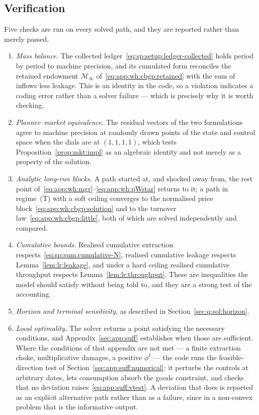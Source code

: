 \subsection{Verification}\label{sec:q:sol:verification}

Five checks are run on every solved path, and they are reported rather than merely passed.
\begin{enumerate}
\item \emph{Mass balance.} The collected ledger~\eqref{eq:sp:setup:ledger-collected} holds period by period to machine precision, and its cumulated form reconciles the retained endowment $\mathcal M_\infty$ of~\eqref{eq:app:wh:cbgp:retained} with the sum of inflows less leakage. This is an identity in the code, so a violation indicates a coding error rather than a solver failure --- which is precisely why it is worth checking.
\item \emph{Planner--market equivalence.} The residual vectors of the two formulations agree to machine precision at randomly drawn points of the state and control space when the dials are at $\left(1,1,1,1\right)$, which tests Proposition~\ref{prop:mkt:impl} as an algebraic identity and not merely as a property of the solution.
\item \emph{Analytic long-run blocks.} A path started at, and shocked away from, the rest point of~\eqref{eq:app:wh:mgr}--\eqref{eq:app:wh:pWstar} returns to it; a path in regime~(T) with a soft ceiling converges to the normalised price block~\eqref{eq:app:wh:cbgp:solution} and to the turnover law~\eqref{eq:app:wh:cbgp:little}, both of which are solved independently and compared.
\item \emph{Cumulative bounds.} Realised cumulative extraction respects~\eqref{eq:sp:sum:cumulative-N}, realised cumulative leakage respects Lemma~\ref{lem:lr:leakage}, and under a hard ceiling realised cumulative throughput respects Lemma~\ref{lem:lr:throughput}. These are inequalities the model should satisfy without being told to, and they are a strong test of the accounting.
\item \emph{Horizon and terminal sensitivity}, as described in Section~\ref{sec:q:sol:horizon}.
\item \emph{Local optimality.} The solver returns a point satisfying the necessary conditions, and Appendix~\ref{sec:app:suff} establishes when those are sufficient. Where the conditions of that appendix are not met --- a finite extraction choke, multiplicative damages, a positive $\phi^I$ --- the code runs the feasible-direction test of Section~\ref{sec:app:suff:numerical}: it perturbs the controls at arbitrary dates, lets consumption absorb the goods constraint, and checks that no deviation raises~\eqref{eq:app:suff:vtest}. A deviation that does is reported as an explicit alternative path rather than as a failure, since in a non-convex problem that is the informative output.
\end{enumerate}

